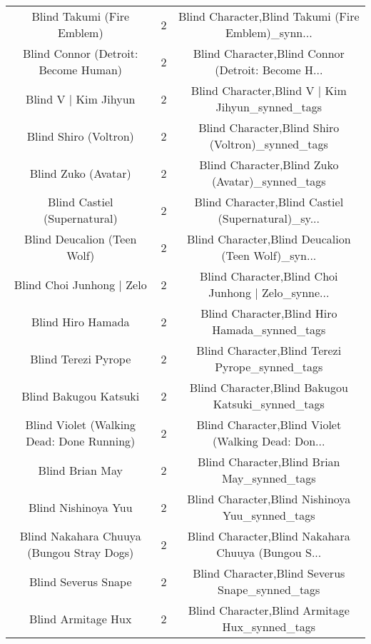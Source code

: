 \begin{table}[h!]
{\begin{tabular}{|c|c|c|}
                        Blind Takumi (Fire Emblem) &          2 & Blind Character,Blind Takumi (Fire Emblem)\_synn... \\
              Blind Connor (Detroit: Become Human) &          2 & Blind Character,Blind Connor (Detroit: Become H... \\
                              Blind V | Kim Jihyun &          2 &   Blind Character,Blind V | Kim Jihyun\_synned\_tags \\
                             Blind Shiro (Voltron) &          2 &  Blind Character,Blind Shiro (Voltron)\_synned\_tags \\
                               Blind Zuko (Avatar) &          2 &    Blind Character,Blind Zuko (Avatar)\_synned\_tags \\
                      Blind Castiel (Supernatural) &          2 & Blind Character,Blind Castiel (Supernatural)\_sy... \\
                       Blind Deucalion (Teen Wolf) &          2 & Blind Character,Blind Deucalion (Teen Wolf)\_syn... \\
                         Blind Choi Junhong | Zelo &          2 & Blind Character,Blind Choi Junhong | Zelo\_synne... \\
                                 Blind Hiro Hamada &          2 &      Blind Character,Blind Hiro Hamada\_synned\_tags \\
                               Blind Terezi Pyrope &          2 &    Blind Character,Blind Terezi Pyrope\_synned\_tags \\
                             Blind Bakugou Katsuki &          2 &  Blind Character,Blind Bakugou Katsuki\_synned\_tags \\
         Blind Violet (Walking Dead: Done Running) &          2 & Blind Character,Blind Violet (Walking Dead: Don... \\
                                   Blind Brian May &          2 &        Blind Character,Blind Brian May\_synned\_tags \\
                               Blind Nishinoya Yuu &          2 &    Blind Character,Blind Nishinoya Yuu\_synned\_tags \\
         Blind Nakahara Chuuya (Bungou Stray Dogs) &          2 & Blind Character,Blind Nakahara Chuuya (Bungou S... \\
                               Blind Severus Snape &          2 &    Blind Character,Blind Severus Snape\_synned\_tags \\
                                Blind Armitage Hux &          2 &     Blind Character,Blind Armitage Hux\_synned\_tags \\

\end{tabular}}
\end{table}
